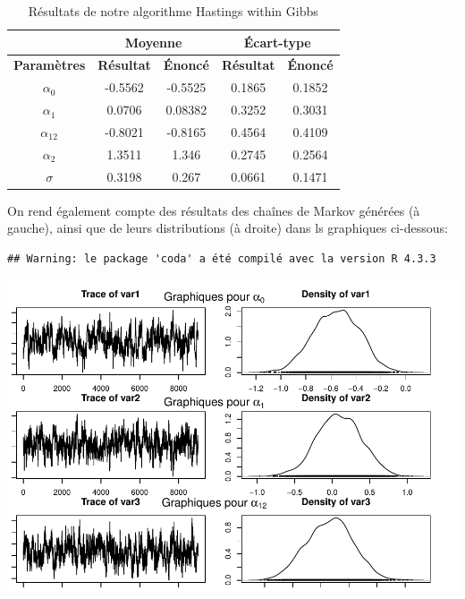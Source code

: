 \documentclass[
]{article}
\begin{document}
\begin{table}[h]
\centering
\small
\begin{minipage}{0.45\textwidth}
\centering
\begin{tabular}{|c|c|c|c|c|}
\hline
\multicolumn{1}{|c|}{} &
\multicolumn{2}{|c|}{\textbf{Moyenne}} & \multicolumn{2}{|c|}{\textbf{Écart-type}} \\
\hline
\textbf{Paramètres} & \textbf{Résultat} & \textbf{Énoncé} & \textbf{Résultat} & \textbf{Énoncé} \\
\hline
$\alpha_0$ & -0.5562 & -0.5525 & 0.1865 & 0.1852 \\
$\alpha_1$ & 0.0706 & 0.08382 & 0.3252 & 0.3031 \\
$\alpha_{12}$ & -0.8021 & -0.8165 & 0.4564 & 0.4109 \\
$\alpha_2$ & 1.3511 & 1.346 & 0.2745 & 0.2564 \\
$\sigma$ & 0.3198 & 0.267 & 0.0661 & 0.1471 \\
\hline
\end{tabular}
\caption{Résultats de notre algorithme Hastings within Gibbs}
\end{minipage}
\end{table}

On rend également compte des résultats des chaînes de Markov générées (à
gauche), ainsi que de leurs distributions (à droite) dans ls graphiques
ci-dessous:

\begin{verbatim}
## Warning: le package 'coda' a été compilé avec la version R 4.3.3
\end{verbatim}

\begin{center}\includegraphics{projet1---rapport_files/figure-latex/unnamed-chunk-1-1} \end{center}
\end{document}
